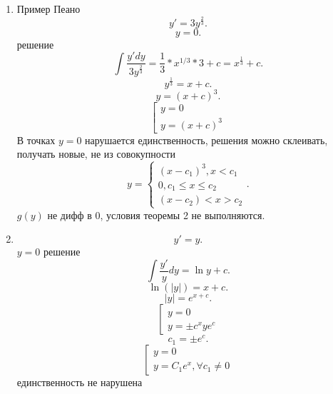 \documentclass[14pt]{extarticle}
\begin{document}
\begin{enumerate}
    \item Пример Пеано
        \[
        y' = 3 y^{\frac{2}{3}}
        .\] 
        \[
        y = 0
        .\] 
        решение
        \[
        \int \frac{y' dy}{3y^{\frac{2}{3}}} = \frac{1}{3} *x^{1/3} * 3 + c = x^{\frac{1}{3}} + c
        .\] 
        \[
        y^{\frac{1}{3}} = x + c
        .\] 
        \[
        y = (x + c)^{3}
        .\] 
        \[
        \left[
        \begin{gathered}
            y = 0\\
            y = (x + c)^{3}
        \end{gathered}
        \right
        .\] 
В точках $y = 0$ нарушается единственность, решения можно склеивать, получать новые, не из совокупности
 \[
y = 
\begin{cases}
    (x - c_1)^{3} ,x <  c_1\\
    0 , c_1 \le  x \le  c_2\\
    (x - c_2)< x > c_2
\end{cases}
.\] 
$g(y)$ не дифф в 0, условия теоремы 2 не выполняются.
\item
     \[
    y' = y
    .\] 
    $y = 0$ решение
     \[
         \int \frac{y'}{y} dy = \ln{y} +  c
    .\] 
    \[
        \ln{(|y|)} = x + c
    .\] 
    \[
    |y| = e^{x + c}
    .\] 
    \[
        \left[
            \begin{gathered}
                y = 0\\
                y = \pm c^{x}y e^{c}
            \end{gathered}
    \right
    .\] 
    \[
    c_1 = \pm e^{c}
    .\] 
    \[
        \left [
            \begin{gathered}
                y = 0\\
                y = C_1 e^{x}, \forall  c_1 \neq 0
            \end{gathered}
        \right
    .\] 
    единственность не нарушена
\end{enumerate}
\end{document}
